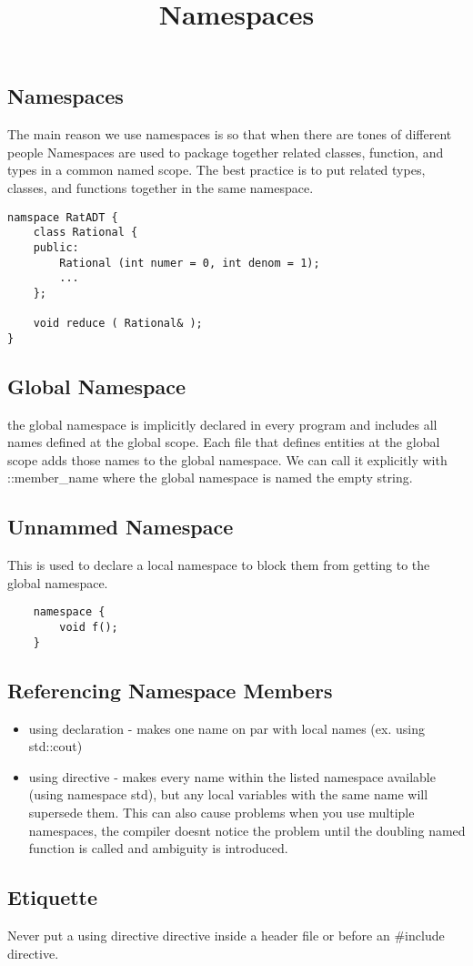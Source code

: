 \documentclass[12pt]{article}
\title{Namespaces}
\begin{document}
\maketitle
\subsection*{Namespaces}
The main reason we use namespaces is so that when there are tones of different people Namespaces are used to package together related classes, function, and types in a common named scope. The best practice is to put related types, classes, and functions together in the same namespace.
\begin{verbatim}
namspace RatADT {
    class Rational {
    public:
        Rational (int numer = 0, int denom = 1);
        ...
    };

    void reduce ( Rational& );
}
\end{verbatim}

\subsection*{Global Namespace}
the global namespace is implicitly declared in every program and includes all names defined at the global scope. Each file that defines entities at the global scope adds those names to the global namespace. We can call it explicitly with ::member\_name where the global namespace is named the empty string.

\subsection*{Unnammed Namespace}
This is used to declare a local namespace to block them from getting to the global namespace.
\begin{verbatim}
    namespace {
        void f();
    }
\end{verbatim}

\subsection*{Referencing Namespace Members}
\begin{itemize}
    \item using declaration - makes one name on par with local names (ex. using std::cout)
    \item using directive - makes every name within the listed namespace available (using namespace std), but any local variables with the same name will supersede them. This can also cause problems when you use multiple namespaces, the compiler doesnt notice the problem until the doubling named function is called and ambiguity is introduced.
\end{itemize}

\subsection*{Etiquette}
Never put a using directive directive inside a header file or before an \#include directive.
\end{document}

